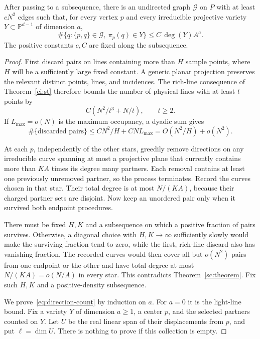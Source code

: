 \begin{proposition}\label{red:directions}
After passing to a subsequence, there is an undirected graph
\(\mathcal G\) on \(P\) with at least \(cN^2\) edges such that, for every
vertex \(p\) and every irreducible projective variety
\(Y\subset\mathbb P^{d-1}\) of dimension \(a\),
\begin{equation}\label{eq:direction-count}
 \#\{q:\{p,q\}\in\mathcal G,\ \pi_p(q)\in Y\}
 \le C\,\deg(Y)A^a.
\end{equation}
The positive constants \(c,C\) are fixed along the subsequence.
\end{proposition}

\begin{proof}
First discard pairs on lines containing more than \(H\) sample points,
where \(H\) will be a sufficiently large fixed constant.
A generic planar projection preserves the relevant distinct points,
lines, and incidences. The rich-line consequence of
Theorem~\ref{ci:st} therefore bounds the number of physical lines with
at least \(t\) points by
\[
 C(N^2/t^3+N/t),\qquad t\ge2.
\]
If \(L_{\max}=o(N)\) is the maximum occupancy, a dyadic sum gives
\[
 \#\{\text{discarded pairs}\}
 \le C N^2/H+C N L_{\max}=O(N^2/H)+o(N^2).
\]

At each \(p\), independently of the other stars, greedily remove
directions on any irreducible curve spanning at most a projective plane
that currently contains more than \(K A\) times its degree many
partners. Each removal contains at least one previously unremoved
partner, so the process terminates. Record the curves chosen in that
star. Their total degree is at most \(N/(KA)\), because their charged
partner sets are disjoint. Now keep an unordered pair only when it
survived both endpoint procedures.

There must be fixed \(H,K\) and a subsequence on which a positive
fraction of pairs survives. Otherwise, a diagonal choice with
\(H,K\to\infty\) sufficiently slowly would make the surviving fraction
tend to zero, while the first, rich-line discard also has vanishing
fraction. The recorded curves would then cover all but \(o(N^2)\)
pairs from one endpoint or the other and have total degree at most
\(N/(KA)=o(N/A)\) in every star. This contradicts
Theorem~\ref{sc:theorem}. Fix such \(H,K\) and a positive-density
subsequence.

We prove~\eqref{eq:direction-count} by induction on \(a\). For \(a=0\)
it is the light-line bound. Fix a variety \(Y\) of dimension \(a\ge1\),
a center \(p\), and the selected partners counted on \(Y\). Let \(U\)
be the real linear span of their displacements from \(p\), and put
\(\ell=\dim U\). There is nothing to prove if this collection is empty.


\end{proof}
